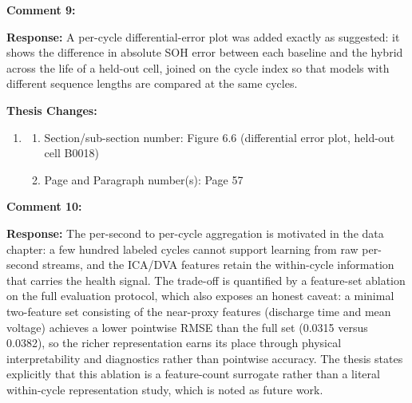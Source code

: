 \documentclass[12pt,a4paper]{article}
\begin{document}
\vspace{\baselineskip}

\textbf{Comment 9:} 

\vspace{\baselineskip}

\textbf{Response:} A per-cycle differential-error plot was added exactly as
suggested: it shows the difference in absolute SOH error between each baseline
and the hybrid across the life of a held-out cell, joined on the cycle index so
that models with different sequence lengths are compared at the same cycles.

\vspace{\baselineskip}

\textbf{Thesis Changes:}

\begin{enumerate}
    \item
    \begin{enumerate}
        \item Section/sub-section number: Figure 6.6 (differential error plot, held-out cell B0018)
        \item Page and Paragraph number(s): Page 57
    \end{enumerate}
\end{enumerate}

\vspace{\baselineskip}

\textbf{Comment 10:} 

\vspace{\baselineskip}

\textbf{Response:} The per-second to per-cycle aggregation is motivated in the
data chapter: a few hundred labeled cycles cannot support learning from raw
per-second streams, and the ICA/DVA features retain the within-cycle
information that carries the health signal. The trade-off is quantified by a
feature-set ablation on the full evaluation protocol, which also exposes an
honest caveat: a minimal two-feature set consisting of the near-proxy features
(discharge time and mean voltage) achieves a lower pointwise RMSE than the full
set (0.0315 versus 0.0382), so the richer representation earns its place
through physical interpretability and diagnostics rather than pointwise
accuracy. The thesis states explicitly that this ablation is a feature-count
surrogate rather than a literal within-cycle representation study, which is
noted as future work.
\end{document}
